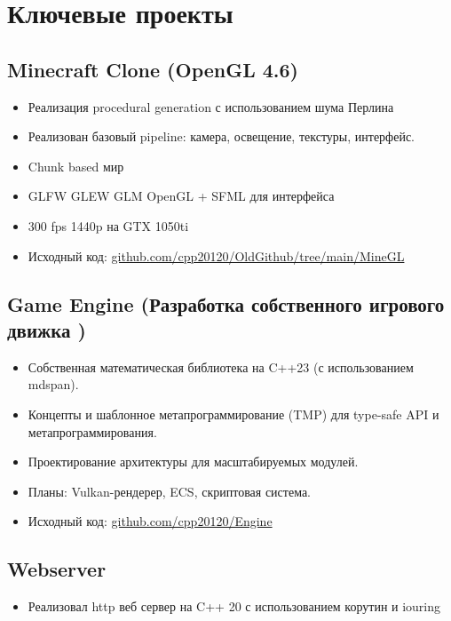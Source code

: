 \documentclass[a4paper,10pt]{article}
\begin{document}
	\section*{Ключевые проекты}
	
	\subsection*{Minecraft Clone (OpenGL 4.6)} 
	\begin{itemize}[noitemsep]
		\item Реализация procedural generation с использованием шума Перлина
		\item Реализован базовый pipeline: камера, освещение, текстуры, интерфейс.
		\item Chunk based мир
		\item GLFW GLEW GLM OpenGL + SFML для интерфейса
		\item 300 fps 1440p на GTX 1050ti
		\item Исходный код: \href{https://github.com/cpp20120/OldGithub/tree/main/MineGL}{github.com/cpp20120/OldGithub/tree/main/MineGL}
	\end{itemize}
	
	\subsection*{Game Engine (Разработка собственного игрового движка )}
	\begin{itemize}[noitemsep]
		\item Собственная математическая библиотека на C++23 (с использованием mdspan).
		\item Концепты и шаблонное метапрограммирование (TMP) для type-safe API и метапрограммирования.
		\item Проектирование архитектуры для масштабируемых модулей.
		\item Планы: Vulkan-рендерер, ECS, скриптовая система.
		\item Исходный код: \href{https://github.com/cpp20120/Engine}{github.com/cpp20120/Engine}
	\end{itemize}

    \subsection*{Webserver}
	\begin{itemize}[noitemsep]
        \item Реализовал http веб сервер на C++ 20 с использованием корутин и iouring
	\end{itemize}
	
\end{document}
